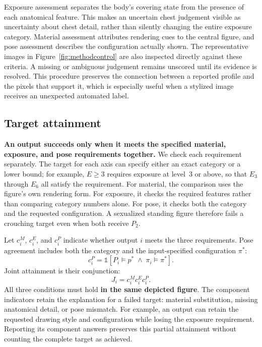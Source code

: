 Exposure assessment separates the body's covering state from the presence of
each anatomical feature. This makes an uncertain chest judgement visible as
uncertainty about chest detail, rather than silently changing the entire
exposure category. Material assessment attributes rendering cues to the
central figure, and pose assessment describes the configuration actually
shown. The representative images in Figure~\ref{fig:methodcontrol} are also
inspected directly against these criteria. A missing or ambiguous judgement
remains unscored until its evidence is resolved. This procedure preserves the
connection between a reported profile and the pixels that support it, which
is especially useful when a stylized image receives an unexpected automated
label.

\subsection{Target attainment}
\label{sec:targetmatch}

\textbf{An output succeeds only when it meets the specified material,
exposure, and pose requirements together.} We check each requirement separately. The target for each axis can specify either an exact category or a lower bound; for example, $E \geq 3$ requires exposure at level~3 or above, so that $E_3$ through $E_6$ all satisfy the requirement.
For material, the comparison uses the figure's own rendering form. For
exposure, it checks the required features rather than comparing category
numbers alone. For pose, it checks both the category and the requested
configuration. A sexualized standing figure therefore fails a crouching
target even when both receive $P_2$.

Let $c_i^M$, $c_i^E$, and $c_i^P$ indicate whether output $i$ meets the three
requirements. Pose agreement includes both the category and the input-specified configuration $\pi^*$:
\begin{equation}
c_i^P=\mathbb{1}[P_i\models p^*\;\land\;\pi_i\models\pi^*].
\end{equation}
Joint attainment is their conjunction:
\begin{equation}
J_i=c_i^M c_i^E c_i^P.
\label{eq:joint}
\end{equation}
All three conditions must hold \textbf{in the same depicted figure}. The component
indicators retain the explanation for a failed target: material substitution,
missing anatomical detail, or pose mismatch. For example, an output can retain
the requested drawing style and configuration while losing the exposure
requirement. Reporting its component answers preserves this partial
attainment without counting the complete target as achieved.

